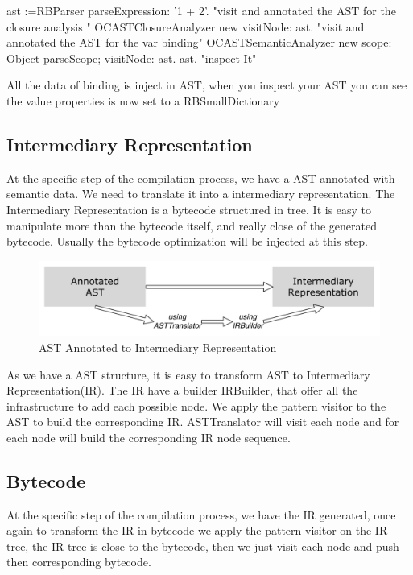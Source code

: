\documentclass[a4paper,10pt,twoside]{book}
\begin{document}
\begin{code}{}
ast :=RBParser parseExpression: '1 + 2'.
"visit and annotated the AST for the closure analysis "
OCASTClosureAnalyzer new visitNode: ast.
"visit and annotated the AST for the var binding"
OCASTSemanticAnalyzer new
		scope: Object parseScope;
		visitNode: ast.
ast. "inspect It"
\end{code}
All the data of binding is inject in AST, when you inspect your AST you can see the value properties is now set to a RBSmallDictionary 




\subsection{Intermediary Representation}
At the specific step of the compilation process, we have a AST annotated with semantic data. We need to translate it into a intermediary representation. The Intermediary Representation is a bytecode structured in tree. It is easy to manipulate more than the bytecode itself, and really close of the generated bytecode. Usually the bytecode optimization will be injected at this step.
 
\begin{figure}[ht]\centering
	\includegraphics[width=\linewidth]{AnnotatedASTToIR}
	\caption{AST Annotated to Intermediary Representation }
\end{figure}

As we have a AST structure, it is easy to transform AST to Intermediary Representation(IR). The IR have a builder IRBuilder, that offer all the infrastructure to add each possible node. We apply the pattern visitor to the AST to build the corresponding IR. ASTTranslator will visit each node and for each node will build the corresponding IR node sequence.


\subsection{Bytecode}
At the specific step of the compilation process, we have the IR generated, once again to transform the IR in bytecode we apply the pattern visitor on the IR tree, the IR tree is close to the bytecode, then we just visit each node and push then corresponding bytecode.
\end{document}
